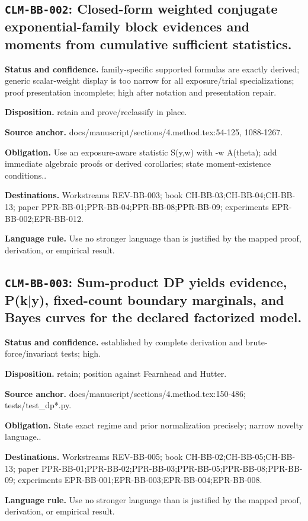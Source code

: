 \subsection[\texttt{CLM-BB-002}]{\texttt{CLM-BB-002}: Closed-form weighted conjugate exponential-family block evidences and moments from cumulative sufficient statistics.}
\textbf{Status and confidence.} family-specific supported formulas are exactly derived; generic scalar-weight display is too narrow for all exposure/trial specializations; proof presentation incomplete; high after notation and presentation repair.\par
\textbf{Disposition.} retain and prove/reclassify in place.\par
\textbf{Source anchor.} docs/manuscript/sections/4.method.tex:54-125, 1088-1267.\par
\textbf{Obligation.} Use an exposure-aware statistic S(y,w) with -w A(theta); add immediate algebraic proofs or derived corollaries; state moment-existence conditions..\par
\textbf{Destinations.} Workstreams REV-BB-003; book CH-BB-03;CH-BB-04;CH-BB-13; paper PPR-BB-01;PPR-BB-04;PPR-BB-08;PPR-BB-09; experiments EPR-BB-002;EPR-BB-012.\par
\textbf{Language rule.} Use no stronger language than is justified by the mapped proof, derivation, or empirical result.

\subsection[\texttt{CLM-BB-003}]{\texttt{CLM-BB-003}: Sum-product DP yields evidence, P(k|y), fixed-count boundary marginals, and Bayes curves for the declared factorized model.}
\textbf{Status and confidence.} established by complete derivation and brute-force/invariant tests; high.\par
\textbf{Disposition.} retain; position against Fearnhead and Hutter.\par
\textbf{Source anchor.} docs/manuscript/sections/4.method.tex:150-486; tests/test\_dp*.py.\par
\textbf{Obligation.} State exact regime and prior normalization precisely; narrow novelty language..\par
\textbf{Destinations.} Workstreams REV-BB-005; book CH-BB-02;CH-BB-05;CH-BB-13; paper PPR-BB-01;PPR-BB-02;PPR-BB-03;PPR-BB-05;PPR-BB-08;PPR-BB-09; experiments EPR-BB-001;EPR-BB-003;EPR-BB-004;EPR-BB-008.\par
\textbf{Language rule.} Use no stronger language than is justified by the mapped proof, derivation, or empirical result.

